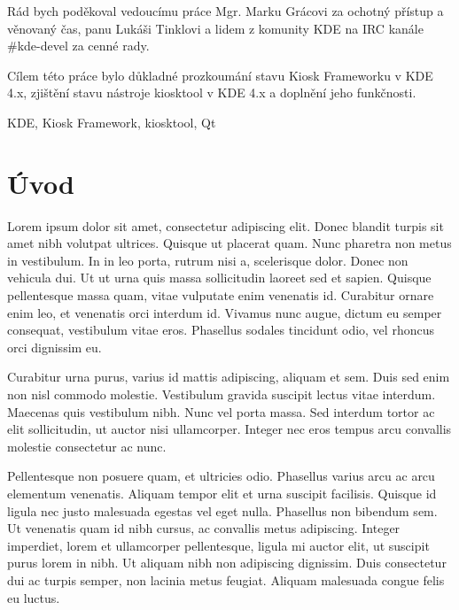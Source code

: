 \documentclass[oneside,11pt]{fithesis2}
\begin{document}
  
\VerbatimFootnotes
\FrontMatter  
\ThesisTitlePage  

\setcounter{page}{1} 

\begin{ThesisDeclaration}  
\DeclarationText  
\AdvisorName  
\end{ThesisDeclaration}   

\begin{ThesisThanks}  
Rád bych poděkoval vedoucímu práce Mgr. Marku Grácovi za ochotný přístup a věnovaný čas, panu Lukáši Tinklovi a lidem z komunity KDE na IRC kanále \#kde-devel za cenné rady.
\end{ThesisThanks}  
 
\begin{ThesisAbstract}  
Cílem této práce bylo důkladné prozkoumání stavu Kiosk Frameworku v KDE 4.x, zjištění stavu nástroje kiosktool v KDE 4.x a doplnění jeho funkčnosti.
\end{ThesisAbstract}  
 
\begin{ThesisKeyWords}  
KDE, Kiosk Framework, kiosktool, Qt
\end{ThesisKeyWords}  
 
\MainMatter

\tableofcontents   
\chapter{Úvod}
Lorem ipsum dolor sit amet, consectetur adipiscing elit. Donec blandit turpis sit amet nibh volutpat ultrices. Quisque ut placerat quam. Nunc pharetra non metus in vestibulum. In in leo porta, rutrum nisi a, scelerisque dolor. Donec non vehicula dui. Ut ut urna quis massa sollicitudin laoreet sed et sapien. Quisque pellentesque massa quam, vitae vulputate enim venenatis id. Curabitur ornare enim leo, et venenatis orci interdum id. Vivamus nunc augue, dictum eu semper consequat, vestibulum vitae eros. Phasellus sodales tincidunt odio, vel rhoncus orci dignissim eu.

Curabitur urna purus, varius id mattis adipiscing, aliquam et sem. Duis sed enim non nisl commodo molestie. Vestibulum gravida suscipit lectus vitae interdum. Maecenas quis vestibulum nibh. Nunc vel porta massa. Sed interdum tortor ac elit sollicitudin, ut auctor nisi ullamcorper. Integer nec eros tempus arcu convallis molestie consectetur ac nunc.

Pellentesque non posuere quam, et ultricies odio. Phasellus varius arcu ac arcu elementum venenatis. Aliquam tempor elit et urna suscipit facilisis. Quisque id ligula nec justo malesuada egestas vel eget nulla. Phasellus non bibendum sem. Ut venenatis quam id nibh cursus, ac convallis metus adipiscing. Integer imperdiet, lorem et ullamcorper pellentesque, ligula mi auctor elit, ut suscipit purus lorem in nibh. Ut aliquam nibh non adipiscing dignissim. Duis consectetur dui ac turpis semper, non lacinia metus feugiat. Aliquam malesuada congue felis eu luctus.
\end{document}
